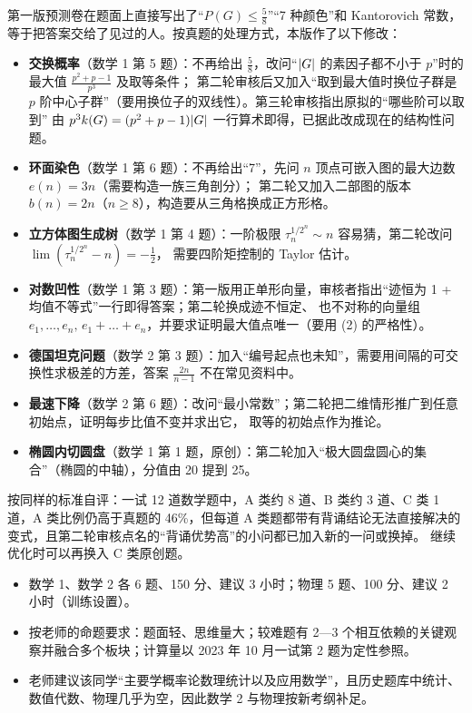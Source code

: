 \documentclass[cjk=noto, nomargin]{mojing-notes}
\begin{document}
第一版预测卷在题面上直接写出了“$P(G)\le\frac58$”“7 种颜色”和 Kantorovich 常数，等于把答案交给了见过的人。按真题的处理方式，本版作了以下修改：
\begin{itemize}
  \item \textbf{交换概率}（数学 1 第 5 题）：不再给出 $\frac58$，改问“$\lvert G\rvert$ 的素因子都不小于 $p$”时的最大值 $\frac{p^2+p-1}{p^3}$ 及取等条件；
        第二轮审核后又加入“取到最大值时换位子群是 $p$ 阶中心子群”（要用换位子的双线性）。第三轮审核指出原拟的“哪些阶可以取到”
        由 $p^3k(G)=(p^2+p-1)\lvert G\rvert$ 一行算术即得，已据此改成现在的结构性问题。
  \item \textbf{环面染色}（数学 1 第 6 题）：不再给出“7”，先问 $n$ 顶点可嵌入图的最大边数 $e(n)=3n$（需要构造一族三角剖分）；
        第二轮又加入二部图的版本 $b(n)=2n$（$n\ge8$），构造要从三角格换成正方形格。
  \item \textbf{立方体图生成树}（数学 1 第 4 题）：一阶极限 $\tau_n^{1/2^n}\sim n$ 容易猜，第二轮改问 $\lim(\tau_n^{1/2^n}-n)=-\frac12$，
        需要四阶矩控制的 Taylor 估计。
  \item \textbf{对数凹性}（数学 1 第 3 题）：第一版用正单形向量，审核者指出“迹恒为 1 + 均值不等式”一行即得答案；第二轮换成迹不恒定、
        也不对称的向量组 $e_1,\dots,e_n,\,e_1+\dots+e_n$，并要求证明最大值点唯一（要用 (2) 的严格性）。
  \item \textbf{德国坦克问题}（数学 2 第 3 题）：加入“编号起点也未知”，需要用间隔的可交换性求极差的方差，答案 $\frac{2n}{n-1}$ 不在常见资料中。
  \item \textbf{最速下降}（数学 2 第 6 题）：改问“最小常数”；第二轮把二维情形推广到任意初始点，证明每步比值不变并求出它，
        取等的初始点作为推论。
  \item \textbf{椭圆内切圆盘}（数学 1 第 1 题，原创）：第二轮加入“极大圆盘圆心的集合”（椭圆的中轴），分值由 20 提到 25。
\end{itemize}
按同样的标准自评：一试 12 道数学题中，A 类约 8 道、B 类约 3 道、C 类 1 道，A 类比例仍高于真题的 46\%，但每道 A 类题都带有背诵结论无法直接解决的变式，且第二轮审核点名的“背诵优势高”的小问都已加入新的一问或换掉。
继续优化时可以再换入 C 类原创题。


\begin{keypoints}
\begin{itemize}
  \item 数学 1、数学 2 各 6 题、150 分、建议 3 小时；物理 5 题、100 分、建议 2 小时（训练设置）。
  \item 按老师的命题要求：题面轻、思维量大；较难题有 2—3 个相互依赖的关键观察并融合多个板块；计算量以 2023 年 10 月一试第 2 题为定性参照。
  \item 老师建议该同学“主要学概率论数理统计以及应用数学”，且历史题库中统计、数值代数、物理几乎为空，因此数学 2 与物理按新考纲补足。
\end{itemize}
\end{keypoints}
\end{document}
